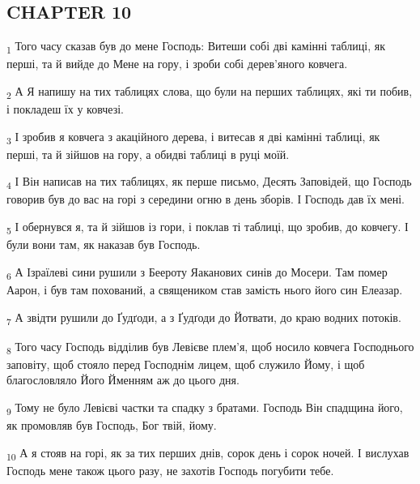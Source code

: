 \subsection{CHAPTER 10}
\begin{tcolorbox}
\textsubscript{1} Того часу сказав був до мене Господь: Витеши собі дві камінні таблиці, як перші, та й вийде до Мене на гору, і зроби собі дерев'яного ковчега.
\end{tcolorbox}
\begin{tcolorbox}
\textsubscript{2} А Я напишу на тих таблицях слова, що були на перших таблицях, які ти побив, і покладеш їх у ковчезі.
\end{tcolorbox}
\begin{tcolorbox}
\textsubscript{3} І зробив я ковчега з акаційного дерева, і витесав я дві камінні таблиці, як перші, та й зійшов на гору, а обидві таблиці в руці моїй.
\end{tcolorbox}
\begin{tcolorbox}
\textsubscript{4} І Він написав на тих таблицях, як перше письмо, Десять Заповідей, що Господь говорив був до вас на горі з середини огню в день зборів. І Господь дав їх мені.
\end{tcolorbox}
\begin{tcolorbox}
\textsubscript{5} І обернувся я, та й зійшов із гори, і поклав ті таблиці, що зробив, до ковчегу. І були вони там, як наказав був Господь.
\end{tcolorbox}
\begin{tcolorbox}
\textsubscript{6} А Ізраїлеві сини рушили з Беероту Яаканових синів до Мосери. Там помер Аарон, і був там похований, а священиком став замість нього його син Елеазар.
\end{tcolorbox}
\begin{tcolorbox}
\textsubscript{7} А звідти рушили до Ґудґоди, а з Ґудґоди до Йотвати, до краю водних потоків.
\end{tcolorbox}
\begin{tcolorbox}
\textsubscript{8} Того часу Господь відділив був Левієве плем'я, щоб носило ковчега Господнього заповіту, щоб стояло перед Господнім лицем, щоб служило Йому, і щоб благословляло Його Йменням аж до цього дня.
\end{tcolorbox}
\begin{tcolorbox}
\textsubscript{9} Тому не було Левієві частки та спадку з братами. Господь Він спадщина його, як промовляв був Господь, Бог твій, йому.
\end{tcolorbox}
\begin{tcolorbox}
\textsubscript{10} А я стояв на горі, як за тих перших днів, сорок день і сорок ночей. І вислухав Господь мене також цього разу, не захотів Господь погубити тебе.
\end{tcolorbox}
